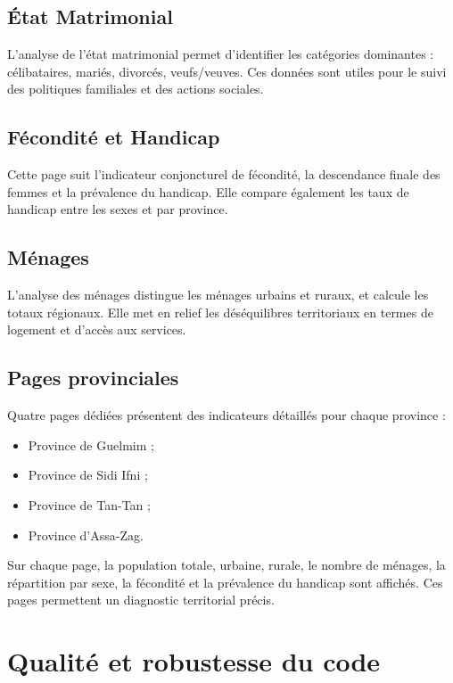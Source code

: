 \documentclass[12pt,a4paper,oneside]{report}
\begin{document}
\subsection{État Matrimonial}

L'analyse de l'état matrimonial permet d'identifier les catégories dominantes : célibataires, mariés, divorcés, veufs/veuves. Ces données sont utiles pour le suivi des politiques familiales et des actions sociales.

\subsection{Fécondité et Handicap}

Cette page suit l'indicateur conjoncturel de fécondité, la descendance finale des femmes et la prévalence du handicap. Elle compare également les taux de handicap entre les sexes et par province.

\subsection{Ménages}

L'analyse des ménages distingue les ménages urbains et ruraux, et calcule les totaux régionaux. Elle met en relief les déséquilibres territoriaux en termes de logement et d'accès aux services.

\subsection{Pages provinciales}

Quatre pages dédiées présentent des indicateurs détaillés pour chaque province :

\begin{itemize}[leftmargin=*]
  \item Province de Guelmim ;
  \item Province de Sidi Ifni ;
  \item Province de Tan-Tan ;
  \item Province d'Assa-Zag.
\end{itemize}

Sur chaque page, la population totale, urbaine, rurale, le nombre de ménages, la répartition par sexe, la fécondité et la prévalence du handicap sont affichés. Ces pages permettent un diagnostic territorial précis.

\section{Qualité et robustesse du code}
\end{document}
